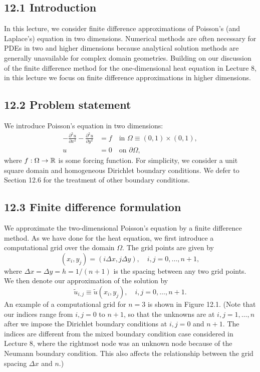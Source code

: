 

\subsection{12.1 Introduction}
In this lecture, we consider finite difference approximations of Poisson's (and Laplace's) equation in two dimensions. Numerical methods are often necessary for PDEs in two and higher dimensions because analytical solution methods are generally unavailable for complex domain geometries. Building on our discussion of the finite difference method for the one-dimensional heat equation in Lecture 8, in this lecture we focus on finite difference approximations in higher dimensions.

\subsection{12.2 Problem statement}
We introduce Poisson's equation in two dimensions:
\begin{align*}
    -\frac{\partial^2 u}{\partial x^2} - \frac{\partial^2 u}{\partial y^2} &= f \quad \text{in } \Omega \equiv (0, 1) \times (0, 1), \\
    u &= 0 \quad \text{on } \partial\Omega,
\end{align*}
where $f : \Omega \to \mathbb{R}$ is some forcing function. For simplicity, we consider a unit square domain and homogeneous Dirichlet boundary conditions. We defer to Section 12.6 for the treatment of other boundary conditions.

\subsection{12.3 Finite difference formulation}
We approximate the two-dimensional Poisson's equation by a finite difference method. As we have done for the heat equation, we first introduce a computational grid over the domain $\Omega$. The grid points are given by
\[(x_i, y_j) = (i\Delta x, j\Delta y), \quad i, j = 0, \dots, n + 1,\]
where $\Delta x = \Delta y = h = 1/(n + 1)$ is the spacing between any two grid points. We then denote our approximation of the solution by
\[\tilde{u}_{i,j} \equiv \tilde{u}(x_i, y_j), \quad i, j = 0, \dots, n + 1.\]
An example of a computational grid for $n = 3$ is shown in Figure 12.1. (Note that our indices range from $i, j = 0$ to $n + 1$, so that the unknowns are at $i, j = 1, \dots, n$ after we impose the Dirichlet boundary conditions at $i, j = 0$ and $n + 1$. The indices are different from the mixed boundary condition case considered in Lecture 8, where the rightmost node was an unknown node because of the Neumann boundary condition. This also affects the relationship between the grid spacing $\Delta x$ and $n$.)

